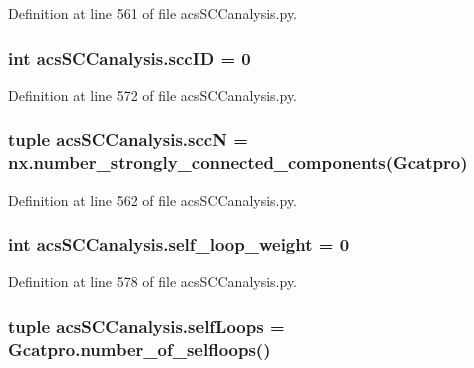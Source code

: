 Definition at line 561 of file acs\-S\-C\-Canalysis.\-py.

\hypertarget{a00096_a1dd3c43841ba4485a66889600f099a0c}{
\subsubsection[{scc\-I\-D}]{\setlength{\rightskip}{0pt plus 5cm}int acs\-S\-C\-Canalysis.\-scc\-I\-D = 0}}\label{a00096_a1dd3c43841ba4485a66889600f099a0c}


Definition at line 572 of file acs\-S\-C\-Canalysis.\-py.

\hypertarget{a00096_a185cbf8ef1ec67f52695562582418793}{
\subsubsection[{scc\-N}]{\setlength{\rightskip}{0pt plus 5cm}tuple acs\-S\-C\-Canalysis.\-scc\-N = nx.\-number\-\_\-strongly\-\_\-connected\-\_\-components({\bf Gcatpro})}}\label{a00096_a185cbf8ef1ec67f52695562582418793}


Definition at line 562 of file acs\-S\-C\-Canalysis.\-py.

\hypertarget{a00096_ae9790fbc87f233c94224436a9cbd59c1}{
\subsubsection[{self\-\_\-loop\-\_\-weight}]{\setlength{\rightskip}{0pt plus 5cm}int acs\-S\-C\-Canalysis.\-self\-\_\-loop\-\_\-weight = 0}}\label{a00096_ae9790fbc87f233c94224436a9cbd59c1}


Definition at line 578 of file acs\-S\-C\-Canalysis.\-py.

\hypertarget{a00096_a8fec45ae9b70981ce94eaeed14d888b1}{
\subsubsection[{self\-Loops}]{\setlength{\rightskip}{0pt plus 5cm}tuple acs\-S\-C\-Canalysis.\-self\-Loops = Gcatpro.\-number\-\_\-of\-\_\-selfloops()}}\label{a00096_a8fec45ae9b70981ce94eaeed14d888b1}


